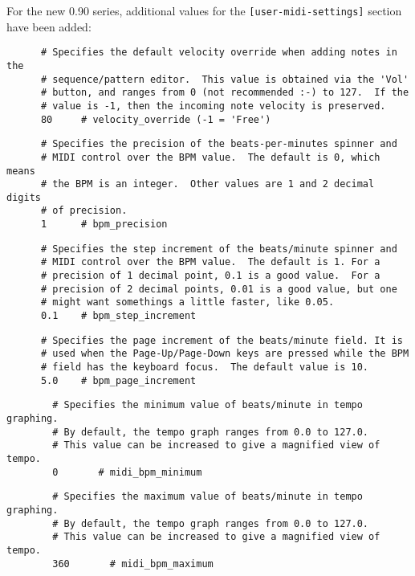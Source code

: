    For the new 0.90 series, additional values for the
   \texttt{[user-midi-settings]} section have been added:

   \begin{verbatim}
      # Specifies the default velocity override when adding notes in the
      # sequence/pattern editor.  This value is obtained via the 'Vol'
      # button, and ranges from 0 (not recommended :-) to 127.  If the
      # value is -1, then the incoming note velocity is preserved.
      80     # velocity_override (-1 = 'Free')
   \end{verbatim}

   \begin{verbatim}
      # Specifies the precision of the beats-per-minutes spinner and
      # MIDI control over the BPM value.  The default is 0, which means
      # the BPM is an integer.  Other values are 1 and 2 decimal digits
      # of precision.
      1      # bpm_precision
   \end{verbatim}

   \begin{verbatim}
      # Specifies the step increment of the beats/minute spinner and
      # MIDI control over the BPM value.  The default is 1. For a
      # precision of 1 decimal point, 0.1 is a good value.  For a
      # precision of 2 decimal points, 0.01 is a good value, but one
      # might want somethings a little faster, like 0.05.
      0.1    # bpm_step_increment
   \end{verbatim}

   \begin{verbatim}
      # Specifies the page increment of the beats/minute field. It is
      # used when the Page-Up/Page-Down keys are pressed while the BPM
      # field has the keyboard focus.  The default value is 10.
      5.0    # bpm_page_increment
   \end{verbatim}

   \begin{verbatim}
		# Specifies the minimum value of beats/minute in tempo graphing.
		# By default, the tempo graph ranges from 0.0 to 127.0.
		# This value can be increased to give a magnified view of tempo.
		0       # midi_bpm_minimum
   \end{verbatim}

   \begin{verbatim}
		# Specifies the maximum value of beats/minute in tempo graphing.
		# By default, the tempo graph ranges from 0.0 to 127.0.
		# This value can be increased to give a magnified view of tempo.
		360       # midi_bpm_maximum
   \end{verbatim}

